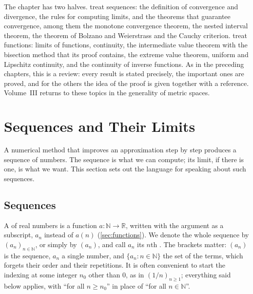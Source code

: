 The chapter has two halves.  treat sequences: the definition of convergence and divergence, the rules for computing limits, and the theorems that guarantee convergence, among them the monotone convergence theorem, the nested interval theorem, the theorem of Bolzano and Weierstrass and the Cauchy criterion.  treat functions: limits of functions, continuity, the intermediate value theorem with the bisection method that its proof contains, the extreme value theorem, uniform and Lipschitz continuity, and the continuity of inverse functions. As in the preceding chapters, this is a review: every result is stated precisely, the important ones are proved, and for the others the idea of the proof is given together with a reference. Volume~III returns to these topics in the generality of metric spaces.

\section{Sequences and Their Limits}
\label{sec:sequences}

A numerical method that improves an approximation step by step produces a sequence of numbers. The sequence is what we can compute; its limit, if there is one, is what we want. This section sets out the language for speaking about such sequences.

\subsection{Sequences}

A  of real numbers is a function $a\colon\mathbb N\to\mathbb R$, written with the argument as a subscript, $a_n$ instead of $a(n)$ (\cref{sec:functions}). We denote the whole sequence by $(a_n)_{n\in\mathbb N}$, or simply by $(a_n)$, and call $a_n$ its $n$th . The brackets matter: $(a_n)$ is the sequence, $a_n$ a single number, and $\{a_n: n\in\mathbb N\}$ the set of the terms, which forgets their order and their repetitions. It is often convenient to start the indexing at some integer $n_0$ other than $0$, as in $(1/n)_{n\ge1}$; everything said below applies, with ``for all $n\ge n_0$'' in place of ``for all $n\in\mathbb N$''.

